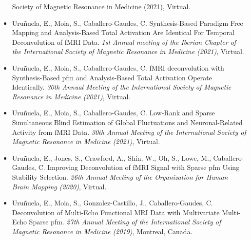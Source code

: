 \begin{itemize}
{{    Society of Magnetic Resonance in Medicine (2021)}, Virtual.}
    \item {Uruñuela, E., Moia, S., Caballero-Gaudes, C. Synthesis-Based Paradigm
    Free Mapping and Analysis-Based Total Activation Are Identical For Temporal
    Deconvolution of fMRI Data. \textit{1st Annual meeting of the Iberian
    Chapter of the International Society of Magnetic Resonance in Medicine
    (2021)}, Virtual.}
    \item {Uruñuela, E., Moia, S., Caballero-Gaudes, C. fMRI deconvolution with
    Synthesis-Based \acrlong*{pfm} and Analysis-Based Total Activation Operate
    Identically. \textit{30th Annual Meeting of the International Society of
    Magnetic Resonance in Medicine (2021)}, Virtual.}
    \item {Uruñuela, E., Moia, S., Caballero-Gaudes, C. Low-Rank and Sparse
    Simultaneous Blind Estimation of Global Fluctuations and Neuronal-Related
    Activity from fMRI Data. \textit{30th Annual Meeting of the International
    Society of Magnetic Resonance in Medicine (2021)}, Virtual.}
    \item {Uruñuela, E., Jones, S., Crawford, A., Shin, W., Oh, S., Lowe, M.,
    Caballero-Gaudes, C. Improving Deconvolution of fMRI Signal with Sparse
    \acrlong*{pfm} Using Stability Selection. \textit{26th Annual Meeting of the
    Organization for Human Brain Mapping (2020)}, Virtual.}
    \item {Uruñuela, E., Moia, S., Gonzalez-Castillo, J., Caballero-Gaudes, C.
    Deconvolution of Multi-Echo Functional MRI Data with Multivariate Multi-Echo
    Sparse \acrlong*{pfm}. \textit{27th Annual Meeting of the International
    Society of Magnetic Resonance in Medicine (2019)}, Montreal, Canada.}
\end{itemize}
